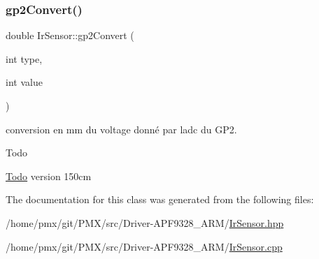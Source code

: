 \subsubsection{\texorpdfstring{gp2\+Convert()}{gp2Convert()}}
{\footnotesize\ttfamily double Ir\+Sensor\+::gp2\+Convert (\begin{DoxyParamCaption}\item[{int}]{type,  }\item[{int}]{value }\end{DoxyParamCaption})}



conversion en mm du voltage donné par l\textquotesingle{}adc du G\+P2. 

\begin{DoxyRefDesc}{Todo}
\item[\hyperlink{todo__todo000002}{Todo}]version 150cm \end{DoxyRefDesc}


The documentation for this class was generated from the following files\+:\begin{DoxyCompactItemize}
\item 
/home/pmx/git/\+P\+M\+X/src/\+Driver-\/\+A\+P\+F9328\+\_\+\+A\+R\+M/\hyperlink{Driver-APF9328__ARM_2IrSensor_8hpp}{Ir\+Sensor.\+hpp}\item 
/home/pmx/git/\+P\+M\+X/src/\+Driver-\/\+A\+P\+F9328\+\_\+\+A\+R\+M/\hyperlink{Driver-APF9328__ARM_2IrSensor_8cpp}{Ir\+Sensor.\+cpp}\end{DoxyCompactItemize}
